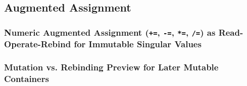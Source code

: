 \subsection{Augmented Assignment}
\subsubsection{Numeric Augmented Assignment (\texttt{+=}, \texttt{-=}, \texttt{*=}, \texttt{/=}) as Read-Operate-Rebind for Immutable Singular Values}
\subsubsection{Mutation vs. Rebinding Preview for Later Mutable Containers}
